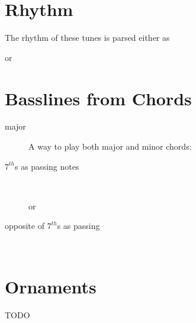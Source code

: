 \documentclass[landscape, 12pt]{article}
\begin{document}
\raggedcolumns %
\begin{multicols}{3}

\section{Rhythm}
The rhythm of these tunes is parsed either as\
\begin{center}
\end{center}
or
\begin{center}
\end{center}

\section{Basslines from Chords}

\begin{description}

\item[major]
A way to play both major and minor chords:
\begin{center}
\end{center}

\item[$7^{th}$s as passing notes] \ 
\begin{center}
\end{center}
or
\begin{center}
\end{center}

\item[opposite of $7^{th}$s as passing] \ 
\begin{center}
\end{center}
\end{description}

\section{Ornaments}
TODO


\end{multicols}
\end{document}
